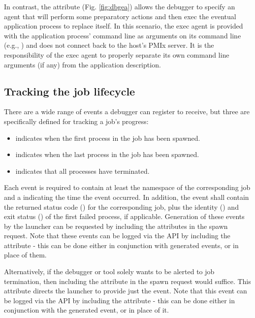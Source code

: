 In contrast, the  attribute (Fig. \ref{fig:dbgea}) allows the debugger to specify an agent that will perform some preparatory actions and then exec the eventual application process to replace itself. In this scenario, the exec agent is provided with the application process' command line as arguments on its command line (e.g., ) and does not connect back to the host's \ac{PMIx} server. It is the responsibility of the exec agent to properly separate its own command line arguments (if any) from the application description.

\subsection{Tracking the job lifecycle}
\label{api:tools:trkjob}

There are a wide range of events a debugger can register to receive, but three
are specifically defined for tracking a job's progress:

\begin{itemize}
    \item {} indicates when the first process in
    the job has been spawned.
    \item {} indicates when the last process in
    the job has been spawned.
    \item {} indicates that all processes have
    terminated.
\end{itemize}

Each event is required to contain at least the namespace of the corresponding
job and a  indicating the time the event
occurred. In addition, the  event shall contain
the returned status code () for the
corresponding job, plus the identity () and exit status
() of the first failed process, if applicable.
Generation of these events by the launcher can be requested by including the
 attributes in the spawn request. Note that
these events can be logged via the  \ac{API} by
including the  attribute - this can be done either
in conjunction with generated events, or in place of them.

Alternatively, if the debugger or tool solely wants to be alerted to job
termination, then including the  attribute in
the spawn request would suffice. This attribute directs the launcher to provide
just the  event. Note that this event can be
logged via the  \ac{API} by including the
 attribute - this can be done either in
conjunction with the generated event, or in place of it.

